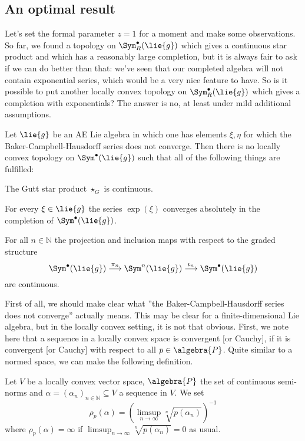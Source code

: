 \subsection{An optimal result}
Let's set the formal parameter $z = 1$ for a moment and make some 
observations. So far, we found a topology on $\Sym_R^{\bullet}(\lie{g})$ which 
gives a continuous star product and which has a reasonably large completion, 
but it is always fair to ask if we can do better than that: we've seen that 
our completed algebra will not contain exponential series, which would be a 
very nice feature to have. So is it possible to put another locally convex 
topology on $\Sym_R^{\bullet}(\lie{g})$ which gives a completion with 
exponentials? The answer is no, at least under mild additional assumptions. 
\begin{proposition}
	\label{Prop:LCAna:NoBetterTopology}
	Let $\lie{g}$ be an AE Lie algebra in which one has elements $\xi, \eta$ 
	for which the Baker-Campbell-Hausdorff series does not converge. 
	Then there is no locally convex topology on $\Sym^{\bullet}(\lie{g})$ 
	such that all of the following things are fulfilled:
	\begin{propositionlist}
		\item
		The Gutt star product $\star_G$ is continuous.
		\item
		For every $\xi \in \lie{g}$ the series $\exp(\xi)$ converges 
		absolutely in the completion of $\Sym^{\bullet}(\lie{g})$.
		\item
		For all $n \in \mathbb{N}$ the projection and inclusion maps with 
		respect to the graded structure
		\begin{equation*}
			\Sym^{\bullet}(\lie{g})
	    		\ot{$\pi_n$}{\longrightarrow}
    	    		\Sym^n(\lie{g})
	    	    	\ot{$\iota_n$}{\longrightarrow}
	    		\Sym^{\bullet}(\lie{g})
		\end{equation*}
		are continuous.
	\end{propositionlist}
\end{proposition}
First of all, we should make clear what ''the Baker-Campbell-Hausdorff series 
does not converge'' actually means. This may be clear for a finite-dimensional 
Lie algebra, but in the locally convex setting, it is not that obvious. First, 
we note here that a sequence in a locally convex space is  convergent [or  
Cauchy], if it is convergent [or Cauchy] with respect to all $p \in 
\algebra{P}$. Quite similar to a normed space, we can make the following
definition.
\begin{definition}
	\label{Def:RadiusOfConvergenceLCS}
	Let $V$ be a locally convex vector space, $\algebra{P}$ the set of 
	continuous semi-norms and $\alpha = (\alpha_n)_{n \in \mathbb{N}} 
	\subseteq V$ a sequence in $V$. We set
	\begin{equation*}
		\rho_p(\alpha)
		=
		\left(
			\limsup_{n \longrightarrow \infty}
			\sqrt[n]{p \left(\alpha_n \right)}
		\right)^{-1}
	\end{equation*}
	where $\rho_p(\alpha) = \infty$ if $\limsup_{n \longrightarrow \infty} 
	\sqrt[n]{p \left(\alpha_n \right)} = 0$ as usual.
\end{definition}

